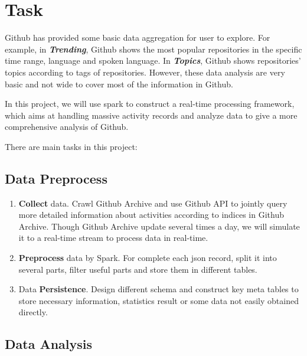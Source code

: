 \section{Task}

Github has provided some basic data aggregation for user to explore. For example, in \textbf{\textit{Trending\cite{ghtrending}}}, Github shows the most popular repositories in the specific time range, language and spoken language. In \textbf{\textit{Topics\cite{ghtopics}}}, Github shows repositories' topics according to tags of repositories. However, these data analysis are very basic and not wide to cover most of the information in Github.

In this project, we will use spark to construct a real-time processing framework, which aims at handling massive activity records and analyze data to give a more comprehensive analysis of Github.

There are main tasks in this project:

\subsection{Data Preprocess}

\begin{enumerate}
    \item \textbf{Collect} data. Crawl Github Archive\cite{gha} and use Github API\cite{ghapi} to jointly query more detailed information about activities according to indices in Github Archive. Though Github Archive update several times a day, we will simulate it to a real-time stream to process data in real-time. 
    \item \textbf{Preprocess} data by Spark. For complete each json record, split it into several parts, filter useful parts and store them in different tables.
    \item Data \textbf{Persistence}. Design different schema and construct key meta tables to store necessary information, statistics result or some data not easily obtained directly.
\end{enumerate}

\subsection{Data Analysis}

